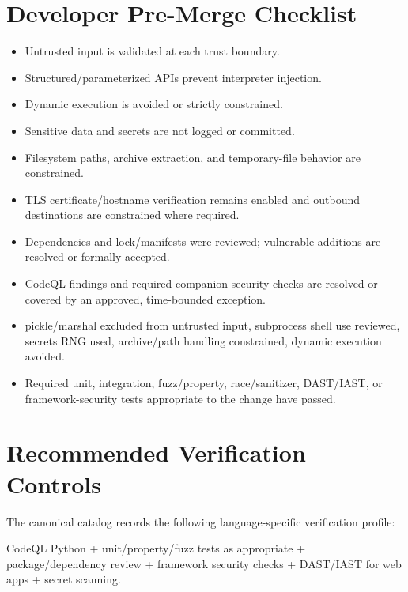 \documentclass[10pt,letterpaper]{article}
\begin{document}
\section{Developer Pre-Merge Checklist}
\begin{itemize}[leftmargin=*,itemsep=2pt]
\item Untrusted input is validated at each trust boundary.
\item Structured/parameterized APIs prevent interpreter injection.
\item Dynamic execution is avoided or strictly constrained.
\item Sensitive data and secrets are not logged or committed.
\item Filesystem paths, archive extraction, and temporary-file behavior are constrained.
\item TLS certificate/hostname verification remains enabled and outbound destinations are constrained where required.
\item Dependencies and lock/manifests were reviewed; vulnerable additions are resolved or formally accepted.
\item CodeQL findings and required companion security checks are resolved or covered by an approved, time-bounded exception.
\item pickle/marshal excluded from untrusted input, subprocess shell use reviewed, secrets RNG used, archive/path handling constrained, dynamic execution avoided.
\item Required unit, integration, fuzz/property, race/sanitizer, DAST/IAST, or framework-security tests appropriate to the change have passed.
\end{itemize}

\section{Recommended Verification Controls}
The canonical catalog records the following language-specific verification profile:

CodeQL Python + unit/property/fuzz tests as appropriate + package/dependency review + framework security checks + DAST/IAST for web apps + secret scanning.
\end{document}
